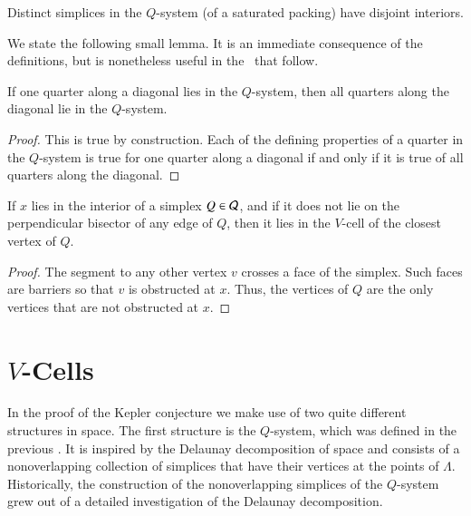 \begin{claim}\label{thm:nonoverlap}
Distinct simplices in the $Q$-system (of a saturated packing) have
disjoint interiors.
\end{claim}


We state the following small lemma. It is an immediate consequence
of the definitions, but is nonetheless useful in the \chaps\ that
follow.

\begin{lemma} \label{lemma:diags-engulf}
If one quarter along a diagonal lies in the $Q$-system, then all
quarters along the diagonal lie in the $Q$-system.
\end{lemma}

\begin{proof} This is true by construction.  Each of the defining properties
of a quarter in the $Q$-system is true for one quarter along a
diagonal if and only if  it is true of all quarters along the
diagonal.
\end{proof}



\begin{lemma}\label{lemma:Q-divide}
If $x$ lies in the interior of a simplex $Q\in{\mathcal Q}$, and if it
does not lie on the perpendicular bisector of any edge of $Q$,
then it lies in the $V$-cell of the closest vertex of $Q$.
\end{lemma}

\begin{proof} The segment to any other vertex $v$ crosses a face of the
simplex. Such faces are barriers so that $v$ is obstructed at $x$.
Thus, the vertices of $Q$ are the only vertices that are not
obstructed at $x$.
\end{proof}



\section{$V$-Cells}
\label{sec:cells} \label{sec:vcells}

In the proof of the Kepler conjecture we make use of two quite
different structures in space.  The first structure is the
$Q$-system, which was defined in the previous \chap.  It is
inspired by the Delaunay decomposition of space and consists of a
nonoverlapping collection of simplices that have their vertices at
the points of $\Lambda$.  Historically, the construction of the
nonoverlapping simplices of the $Q$-system grew out of a detailed
investigation of the Delaunay decomposition.

